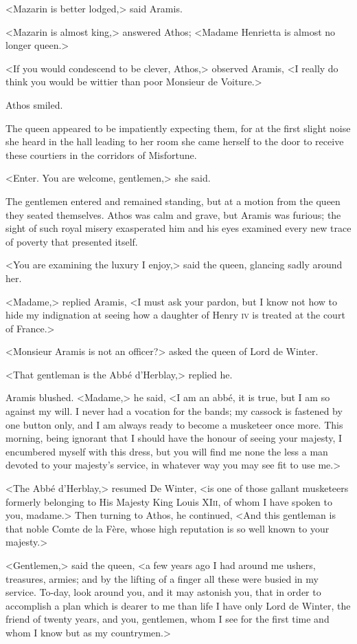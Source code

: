 <Mazarin is better lodged,> said Aramis.

<Mazarin is almost king,> answered Athos; <Madame Henrietta is almost no longer queen.>

<If you would condescend to be clever, Athos,> observed Aramis, <I really do think you would be wittier than poor Monsieur de Voiture.>

Athos smiled.

The queen appeared to be impatiently expecting them, for at the first slight noise she heard in the hall leading to her room she came herself to the door to receive these courtiers in the corridors of Misfortune.

<Enter. You are welcome, gentlemen,> she said.

The gentlemen entered and remained standing, but at a motion from the queen they seated themselves. Athos was calm and grave, but Aramis was furious; the sight of such royal misery exasperated him and his eyes examined every new trace of poverty that presented itself.

<You are examining the luxury I enjoy,> said the queen, glancing sadly around her.

<Madame,> replied Aramis, <I must ask your pardon, but I know not how to hide my indignation at seeing how a daughter of Henry \textsc{iv} is treated at the court of France.>

<Monsieur Aramis is not an officer?> asked the queen of Lord de Winter.

<That gentleman is the Abbé d'Herblay,> replied he.

Aramis blushed. <Madame,> he said, <I am an abbé, it is true, but I am so against my will. I never had a vocation for the bands; my cassock is fastened by one button only, and I am always ready to become a musketeer once more. This morning, being ignorant that I should have the honour of seeing your majesty, I encumbered myself with this dress, but you will find me none the less a man devoted to your majesty's service, in whatever way you may see fit to use me.>

<The Abbé d'Herblay,> resumed De Winter, <is one of those gallant musketeers formerly belonging to His Majesty King Louis XI\textsc{ii}, of whom I have spoken to you, madame.> Then turning to Athos, he continued, <And this gentleman is that noble Comte de la Fère, whose high reputation is so well known to your majesty.>

<Gentlemen,> said the queen, <a few years ago I had around me ushers, treasures, armies; and by the lifting of a finger all these were busied in my service. To-day, look around you, and it may astonish you, that in order to accomplish a plan which is dearer to me than life I have only Lord de Winter, the friend of twenty years, and you, gentlemen, whom I see for the first time and whom I know but as my countrymen.>

